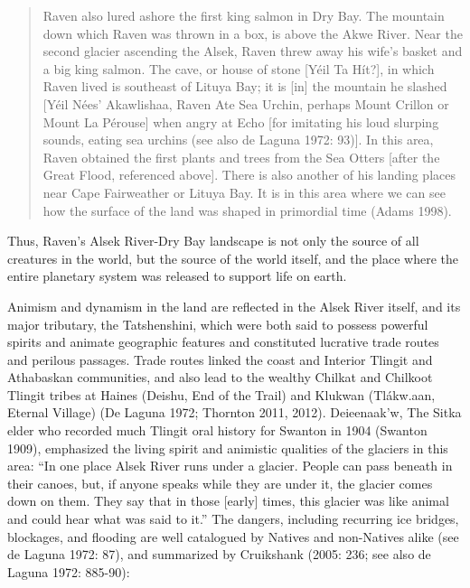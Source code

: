 \begin{quote}
Raven also lured ashore the first king salmon in Dry Bay. The mountain down which Raven was thrown in a box, is above the Akwe River. Near the second glacier ascending the Alsek, Raven threw away his wife's basket and a big king salmon. The cave, or house of stone [Yéil Ta Hít?], in which Raven lived is southeast of Lituya Bay; it is [in] the mountain he slashed [Yéil Nées' Akawlishaa, Raven Ate Sea Urchin, perhaps Mount Crillon or Mount La Pérouse] when angry at Echo [for imitating his loud slurping sounds, eating sea urchins (see also de Laguna 1972: 93)].  In this area, Raven obtained the first plants and trees from the Sea Otters [after the Great Flood, referenced above]. There is also another of his landing places near Cape Fairweather or Lituya Bay. It is in this area where we can see how the surface of the land was shaped in primordial time (Adams 1998).
\end{quote}
\noindent
Thus, Raven’s Alsek River-Dry Bay landscape is not only the source of all creatures in the world, but the source of the world itself, and the place where the entire planetary system was released to support life on earth.

Animism and dynamism in the land are reflected in the Alsek River itself, and its major tributary, the Tatshenshini, which were both said to possess powerful spirits and animate geographic features and constituted lucrative trade routes and perilous passages. Trade routes linked the coast and Interior Tlingit and Athabaskan communities, and also lead to the wealthy Chilkat and Chilkoot Tlingit tribes at Haines (Deishu, End of the Trail) and Klukwan (Tlákw.aan, Eternal Village) (De Laguna 1972; Thornton 2011, 2012). Deieenaak’w, The Sitka elder who recorded much Tlingit oral history for Swanton in 1904 (Swanton 1909), emphasized the living spirit and animistic qualities of the glaciers in this area: “In one place Alsek River runs under a glacier. People can pass beneath in their canoes, but, if anyone speaks while they are under it, the glacier comes down on them. They say that in those [early] times, this glacier was like animal and could hear what was said to it.” The dangers, including recurring ice bridges, blockages, and flooding are well catalogued by Natives and non-Natives alike (see de Laguna 1972: 87), and summarized by Cruikshank (2005: 236; see also de Laguna 1972: 885-90):


